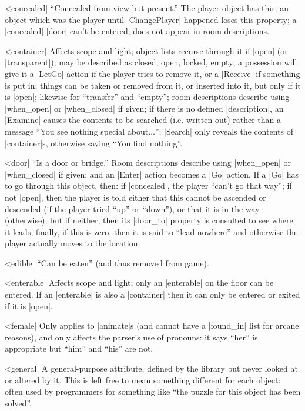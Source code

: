 ^^|concealed|%
``Concealed from view but present.''
The player object has this; an object which was the player until
|ChangePlayer| happened loses this property; a |concealed| |door| can't be
entered; does not appear in room descriptions.

^^|container|%
Affects scope and light; object lists
recurse through it if |open| (or |transparent|); may be described as closed,
open, locked, empty; a possession will give it a |LetGo| action if the
player tries to remove it, or a |Receive| if something is put in; things can
be taken or removed from it, or inserted into it, but only if it is |open|;
likewise for ``transfer'' and ``empty''; room descriptions describe using
|when_open| or |when_closed| if given; if there is no defined |description|,
an |Examine| causes the contents to be searched (i.e. written out) rather
than a message ``You see nothing special about$\ldots$''; |Search| only reveals
the contents of |container|s, otherwise saying ``You find nothing''.

^^|door|
``Is a door or bridge.''  Room descriptions
describe using |when_open| or |when_closed| if given; and an |Enter|
action becomes a |Go| action.  If a |Go| has to go through this
object, then: if |concealed|, the player ``can't go that way'';
if not |open|, then the player is told either that this cannot
be ascended or descended (if the player tried ``up'' or
``down''), or that it is in the way (otherwise);
but if neither, then its |door_to| property is consulted to
see where it leads; finally, if this is zero, then it is said
to ``lead nowhere'' and otherwise the player actually moves to
the location.

^^|edible|
``Can be eaten'' (and thus removed from game).

^^|enterable|
Affects scope and light; only an |enterable| on the floor can be
entered.  If an |enterable| is also a |container| then it can
only be entered or exited if it is |open|.

^^|female|
Only applies to |animate|s (and cannot have
a |found_in| list for arcane reasons), and only affects the parser's
use of pronouns: it says ``her'' is appropriate but ``him'' and ``his''
are not.

^^|general|
A general-purpose attribute, defined by
the library but never looked at or altered by it.  This is left
free to mean something different for each object: often used by
programmers for something like ``the puzzle for this object has been
solved''.


